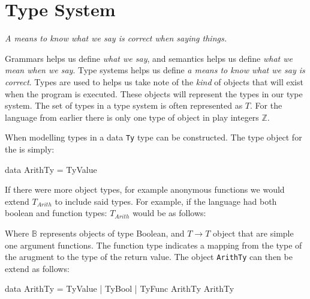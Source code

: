 \section{Type System}
\label{sec:type}

\begin{center}\large\em
A means to know what we say is correct when saying things.
\end{center}

Grammars helps us define \emph{what we say}, and semantics helps us define \emph{what we mean when we say}.
Type systems helps us define \emph{a means to know what we say is correct}.
Types are used to helps us take note of the \emph{kind} of objects that will exist when the program is executed.
These objects will represent the types in our type system.
The set of types in a type system is often represented as $T$.
For the \allang{} language from earlier there is only one type of object in play integers $\mathbb{Z}$.

\begin{bnf}
\end{bnf}

\noindent
When modelling types in \idris{} a data \texttt{Ty} type can be constructed.
The type object for the \allang{} is simply:

\begin{code}
data ArithTy = TyValue
\end{code}

\noindent
If there were more object types, for example anonymous functions we would extend $T_{Arith}$ to include said types.
For example, if the \allang{} language had both boolean and function types: $T_{Arith}$ would be as follows:

\begin{bnf}
\end{bnf}

\noindent
Where $\mathbb{B}$ represents objects of type Boolean, and $T\rightarrow T$ object that are simple one argument functions.
The function type indicates a mapping from the type of the arugment to the type of the return value.
The object \texttt{ArithTy} can then be extend as follows:

\begin{code}
data ArithTy = TyValue
             | TyBool
             | TyFunc ArithTy ArithTy
\end{code}


